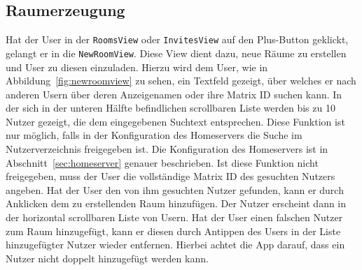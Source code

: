    \newpage
    \subsection{Raumerzeugung}\label{subsec:raumerzeugung}
    Hat der User in der \texttt{RoomsView} oder \texttt{InvitesView} auf den Plus-Button geklickt, gelangt er in die \texttt{NewRoomView}.
    Diese View dient dazu, neue Räume zu erstellen und User zu diesen einzuladen.
    Hierzu wird dem User, wie in Abbildung~\ref{fig:newroomview} zu sehen, ein Textfeld gezeigt, über welches er nach anderen Usern über deren Anzeigenamen oder ihre Matrix ID suchen kann.
    In der sich in der unteren Hälfte befindlichen scrollbaren Liste werden bis zu 10 Nutzer gezeigt, die dem eingegebenen Suchtext entsprechen.
    Diese Funktion ist nur möglich, falls in der Konfiguration des Homeservers die Suche im Nutzerverzeichnis freigegeben ist.
    Die Konfiguration des Homeservers ist in Abschnitt~\ref{sec:homeserver} genauer beschrieben.
    Ist diese Funktion nicht freigegeben, muss der User die vollständige Matrix ID des gesuchten Nutzers angeben.
    Hat der User den von ihm gesuchten Nutzer gefunden, kann er durch Anklicken dem zu erstellenden Raum hinzufügen.
    Der Nutzer erscheint dann in der horizontal scrollbaren Liste von Usern.
    Hat der User einen falschen Nutzer zum Raum hinzugefügt, kann er diesen durch Antippen des Users in der Liste hinzugefügter Nutzer wieder entfernen.
    Hierbei achtet die App darauf, dass ein Nutzer nicht doppelt hinzugefügt werden kann.

